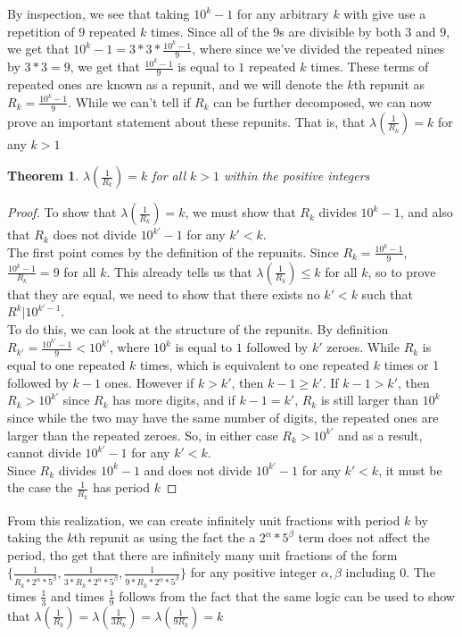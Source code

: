 \documentclass[12pt]{amsart}
\newtheorem{theorem}{Theorem}[section]
\theoremstyle{definition}
\theoremstyle{remark}
\begin{document}
By inspection, we see that taking $10^k-1$ for any arbitrary $k$ with give use a repetition of $9$ repeated $k$ times. Since all of the $9$s are divisible by both $3$ and $9$, we get that $10^k-1=3*3*\frac{10^k-1}{9}$, where since we've divided the repeated nines by $3*3=9$, we get that $\frac{10^k-1}{9}$ is equal to $1$ repeated $k$ times. These terms of repeated ones are known as a repunit, and we will denote the $k$th repunit as $R_k=\frac{10^k-1}{9}$. While we can't tell if $R_k$ can be further decomposed, we can now prove an important statement about these repunits. That is, that $\lambda(\frac{1}{R_k})=k$ for any $k>1$  
\begin{theorem} \label{thm:Repunit_period}
    $\lambda(\frac{1}{R_k})=k$ for all $k>1$ within the positive integers
\end{theorem}

\begin{proof}
    To show that $\lambda(\frac{1}{R_k})=k$, we must show that $R_k$ divides $10^k-1$, and also that $R_k$ does not divide $10^{k'}-1$ for any $k'<k$. \\
    The first point comes by the definition of the repunits. Since $R_k=\frac{10^k-1}{9}$, $\frac{10^k-1}{R_k}=9$ for all $k$. This already tells us that $\lambda(\frac{1}{R_k})\leq k$ for all $k$, so to prove that they are equal, we need to show that there exists no $k'<k$ such that $R^k | 10^{k'-1}$.\\
    To do this, we can look at the structure of the repunits. By definition $R_{k'}=\frac{10^{k'}-1}{9}<10^{k'} $, where $10^k$ is equal to $1$ followed by $k'$ zeroes. While $R_k$ is equal to one repeated $k$ times, which is equivalent to one repeated $k$ times or 1 followed by $k-1$ ones. However if $k>k'$, then $k-1\geq k'$. If $k-1>k'$, then $R_k>10^{k'}$ since $R_k$ has more digits, and if $k-1=k'$, $R_k$ is still larger than $10^k$ since while the two may have the same number of digits, the repeated ones are larger than the repeated zeroes. So, in either case $R_k>10^{k'}$ and as a result, cannot divide $10^{k'}-1$ for any $k'<k$. \\

    Since $R_k$ divides $10^k-1$ and does not divide $10^{k'}-1$ for any $k'<k$, it must be the case the $\frac{1}{R_k}$ has period $k$
\end{proof}
From this realization, we can create infinitely unit fractions with period $k$ by taking the $k$th repunit as using the fact the a $2^\alpha*5^\beta$ term does not affect the period, tho get that there are infinitely many unit fractions of the form $\{\frac{1}{R_k*2^\alpha*5^\beta},\frac{1}{3*R_k*2^\alpha*5^\beta},\frac{1}{9*R_k*2^\alpha*5^\beta}\}$ for any positive integer $\alpha,\beta$ including $0$. The times $\frac{1}{3}$ and times $\frac{1}{9}$ follows from the fact that the same logic can be used to show that $\lambda(\frac{1}{R_k})=\lambda(\frac{1}{3R_k})=\lambda(\frac{1}{9R_k})=k$\\
\end{document}
